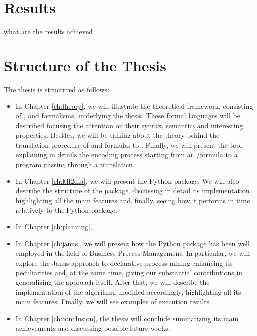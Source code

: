 \section{Results}
what are the results achieved
\section{Structure of the Thesis}
The thesis is structured as follows:
\begin{itemize}
\item In Chapter \ref{ch:theory}, we will illustrate the theoretical framework, consisting of \LTL, \LTLf and \PLTL formalisms, underlying the thesis. These formal languages will be described focusing the attention on their syntax, semantics and interesting properties. Besides, we will be talking about the theory behind the translation procedure of \LTLf and \PLTL formulas to \DFAs. Finally, we will present the \MONA tool explaining in details the encoding process starting from an \LTLf/\PLTL formula to a \MONA program passing through a \FOL translation.

\item In Chapter \ref{ch:ltlf2dfa}, we will present the \LTLfToDFA Python package. We will also describe the structure of the package, discussing in detail its implementation highlighting all the main features and, finally, seeing how it performs in time relatively to the \FLLOAT Python package.

\item In Chapter \ref{ch:planning}, 

\item In Chapter \ref{ch:janus}, we will present how the \LTLfToDFA Python package has been well employed in the field of Business Process Management. In particular, we will explore the Janus approach to declarative process mining enhancing its peculiarities and, at the same time, giving our substantial contributions in generalizing the approach itself. After that, we will describe the implementation of the \janus algorithm, modified accordingly, highlighting all its main features. Finally, we will see examples of execution results.

\item In Chapter \ref{ch:conclusion}, the thesis will conclude summarizing its main achievements and discussing possible future works.
\end{itemize}























